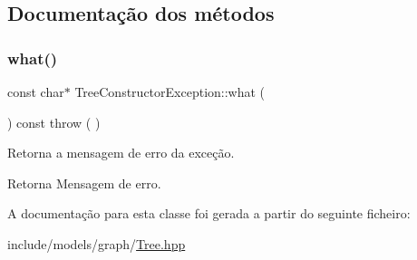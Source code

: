 \subsection{Documentação dos métodos}
\mbox{\label{classTreeConstructorException_acc8b569a2ad401614e1d8a9f6b0bd5d8}} 
\subsubsection{\texorpdfstring{what()}{what()}}
{\footnotesize\ttfamily const char$\ast$ Tree\+Constructor\+Exception\+::what (\begin{DoxyParamCaption}{ }\end{DoxyParamCaption}) const throw ( ) \hspace{0.3cm}{\ttfamily [inline]}}

Retorna a mensagem de erro da exceção. \begin{DoxyReturn}{Retorna}
Mensagem de erro. 
\end{DoxyReturn}


A documentação para esta classe foi gerada a partir do seguinte ficheiro\+:\begin{DoxyCompactItemize}
\item 
include/models/graph/\mbox{\hyperlink{Tree_8hpp}{Tree.\+hpp}}\end{DoxyCompactItemize}
